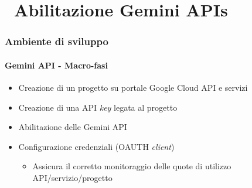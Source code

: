 \section{\faWrench\ Abilitazione Gemini APIs} %
\label{sec:diy-gemini-apis}
%
\begin{frame}[t,fragile] \frametitle{Ambiente di sviluppo}
\framesubtitle{Gemini API - Macro-fasi}
    \begin{itemize}
        \item[\alertedcircled{1}] Creazione di un progetto su portale Google Cloud API e servizi
        \item[\alertedcircled{2}] Creazione di una API \textit{key} legata al progetto
        \item[\alertedcircled{3}] Abilitazione delle Gemini API
        \item[\alertedcircled{4}] Configurazione credenziali (OAUTH \textit{client})
        \begin{itemize}[leftmargin=20pt,align=right]
			\item[\alert{\faArrowCircleRight}] Assicura il corretto monitoraggio delle quote di utilizzo API/servizio/progetto
        \end{itemize}
    \end{itemize}
\end{frame}
%
